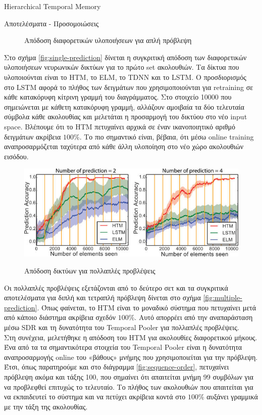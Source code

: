 \documentclass[a4paper,11pt]{article}
\begin{document}
\begin{section}{Hierarchical Temporal Memory}
\begin{subsection}{Αποτελέσματα - Προσομοιώσεις}
\begin{figure}[H]
      \caption{Απόδοση διαφορετικών υλοποιήσεων για απλή πρόβλεψη} \label{fig:single-prediction}
    \end{figure}
    Στο σχήμα \eqref{fig:single-prediction} δίνεται η συγκριτική απόδοση των διαφορετικών υλοποιήσεων νευρωνικών δικτύων για το πρώτο set ακολουθιών. Τα δίκτυα που υλοποιούνται είναι το HTM, το ELM, το TDNN και το LSTM. Ο προσδιορισμός στο LSTM αφορά το πλήθος των δειγμάτων που χρησιμοποιούνται για retraining σε κάθε κατακόρυφη κίτρινη γραμμή του διαγράμματος. Στο στοιχείο 10000 που σημειώνεται με κάθετη κατακόρυφη γραμμή, αλλάζουν αμοιβαία τα δύο τελευταία σύμβολα κάθε ακολουθίας και μελετάται η προσαρμογή του δικτύου στο νέο input space. Βλέπουμε ότι το HTM πετυχαίνει αρχικά σε έναν ικανοποιητικό αριθμό δειγμάτων ακρίβεια $100\%$. Το πιο σημαντικό είναι, βέβαια, ότι μέσω online training αναπροσαρμόζεται ταχύτερα από κάθε άλλη υλοποίηση στο νέο χώρο ακολουθιών εισόδου.\\
    \begin{figure}[H]
      \centering%
      {\includegraphics[width=0.8\columnwidth,clip=true]{pics/multiple_predictions.jpg}}
      \caption{Απόδοση δικτύων για πολλαπλές προβλέψεις} \label{fig:multiple-prediction}
    \end{figure}
    Οι πολλαπλές προβλέψεις εξετάζονται από το δεύτερο σετ και τα συγκριτικά αποτελέσματα για διπλή και τετραπλή πρόβλεψη δίνεται στο σχήμα \eqref{fig:multiple-prediction}. Όπως φαίνεται, το HTM είναι το μοναδικό σύστημα που πετυχαίνει μετά από κάποιο διάστημα ακρίβεια σχεδόν $100\%$. Αυτό απορρέει από την αναπαράσταση μέσω SDR και τη δυνατότητα του Temporal Pooler για πολλαπλές προβλέψεις.\\
    Στη συνέχεια, μελετήθηκε η απόδοση του HTM για ακολουθίες διαφορετικού μήκους. Ένα από τα τα σημαντικότερα στοιχεία του Temporal Pooler είναι η δυνατότητα αναπροσαρμογής online του «βάθους» μνήμης που χρησιμοποιείται για την πρόβλεψη. Έτσι, όπως παρατηρούμε και στο διάγραμμα \eqref{fig:sequence-order}, πετυχαίνει πρόβλεψη ακόμα και τάξης 100, που σημαίνει ότι απαιτείται μνήμη 99 συμβόλων για να προβλεφθεί επιτυχώς το τελευταίο. Το πλήθος των ακολουθιών που απαιτείται για να εκπαιδευτεί το σύστημα και να πετύχει ακρίβεια κοντά στο $100\%$ αυξάνει γραμμικά με την τάξη της ακολουθίας.

\end{subsection}
\end{section}
\end{document}
